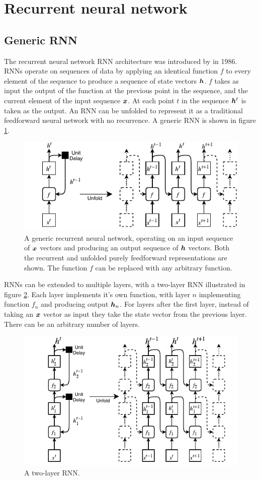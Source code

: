 \section{Recurrent neural network}

\subsection{Generic RNN}
The recurrent neural network RNN architecture was introduced by \cite{Rumelhart1986} in 1986.
RNNs operate on sequences of data by applying an identical function $f$ to every element of the sequence to produce a sequence of state vectors ${\bm{h}}$.
$f$ takes as input the output of the function at the previous point in the sequence, and the current element of the input sequence ${\bm{x}}$.
At each point $t$ in the sequence ${\bm{h}}^t$ is taken as the output.
An RNN can be unfolded to represent it as a traditional feedforward neural network with no recurrence.
A generic RNN is shown in figure \ref{fig:basic_rnn}.

\begin{figure}[htbp]
	\centerline{\includegraphics[trim=0 0cm 0 0, width=.5\textwidth]{images/basic_rnn.pdf}}
	\caption{A generic recurrent neural network, operating on an input sequence of ${\bm{x}}$ vectors and producing an output sequence of ${\bm{h}}$ vectors.
		     Both the recurrent and unfolded purely feedforward representations are shown.
		     The function $f$ can be replaced with any arbitrary function.}
	\label{fig:basic_rnn}
\end{figure}

RNNs can be extended to multiple layers, with a two-layer RNN illustrated in figure \ref{fig:multilayer_rnn}.
Each layer implements it's own function, with layer $n$ implementing function $f_n$ and producing output ${\bm{h}}_n$.
For layers after the first layer, instead of taking an ${\bm{x}}$ vector as input they take the state vector from the previous layer.
There can be an arbitrary number of layers.

\begin{figure}[htbp]
	\centerline{\includegraphics[trim=0 0cm 0 0, width=.5\textwidth]{images/multilayer_rnn.pdf}}
	\caption{A two-layer RNN.}
	\label{fig:multilayer_rnn}
\end{figure}

